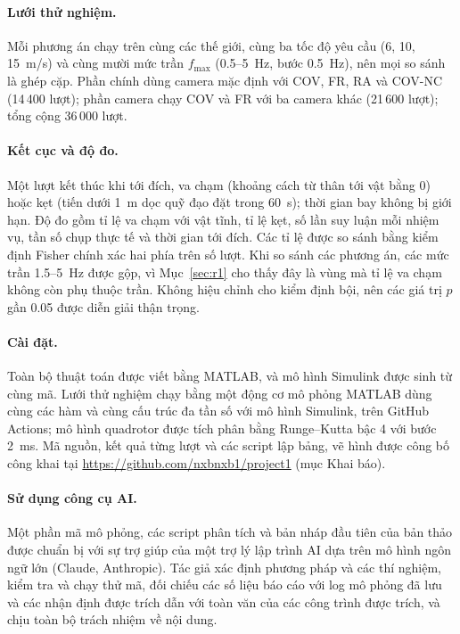\documentclass[11pt,a4paper]{article}
\theoremstyle{plain}
\theoremstyle{definition}
\theoremstyle{remark}
\newcommand{\fmax}{f_{\max}}
\begin{document}
\paragraph{Lưới thử nghiệm.} Mỗi phương án chạy trên cùng các thế giới, cùng ba tốc độ yêu cầu (6, 10, 15~m/s) và cùng mười mức trần $\fmax$ (0.5--5~Hz, bước 0.5~Hz), nên mọi so sánh là ghép cặp. Phần chính dùng camera mặc định với COV, FR, RA và COV-NC (14\,400 lượt); phần camera chạy COV và FR với ba camera khác (21\,600 lượt); tổng cộng 36\,000 lượt.

\paragraph{Kết cục và độ đo.} Một lượt kết thúc khi tới đích, va chạm (khoảng cách từ thân tới vật bằng 0) hoặc kẹt (tiến dưới 1~m dọc quỹ đạo đặt trong 60~s); thời gian bay không bị giới hạn. Độ đo gồm tỉ lệ va chạm với vật tĩnh, tỉ lệ kẹt, số lần suy luận mỗi nhiệm vụ, tần số chụp thực tế và thời gian tới đích. Các tỉ lệ được so sánh bằng kiểm định Fisher chính xác hai phía trên số lượt. Khi so sánh các phương án, các mức trần 1.5--5~Hz được gộp, vì Mục~\ref{sec:r1} cho thấy đây là vùng mà tỉ lệ va chạm không còn phụ thuộc trần. Không hiệu chỉnh cho kiểm định bội, nên các giá trị $p$ gần 0.05 được diễn giải thận trọng.

\paragraph{Cài đặt.} Toàn bộ thuật toán được viết bằng MATLAB, và mô hình Simulink được sinh từ cùng mã. Lưới thử nghiệm chạy bằng một động cơ mô phỏng MATLAB dùng cùng các hàm và cùng cấu trúc đa tần số với mô hình Simulink, trên GitHub Actions; mô hình quadrotor được tích phân bằng Runge--Kutta bậc 4 với bước 2~ms. Mã nguồn, kết quả từng lượt và các script lập bảng, vẽ hình được công bố công khai tại \url{https://github.com/nxbnxb1/project1} (mục Khai báo).

\paragraph{Sử dụng công cụ AI.} Một phần mã mô phỏng, các script phân tích và bản nháp đầu tiên của bản thảo được chuẩn bị với sự trợ giúp của một trợ lý lập trình AI dựa trên mô hình ngôn ngữ lớn (Claude, Anthropic). Tác giả xác định phương pháp và các thí nghiệm, kiểm tra và chạy thử mã, đối chiếu các số liệu báo cáo với log mô phỏng đã lưu và các nhận định được trích dẫn với toàn văn của các công trình được trích, và chịu toàn bộ trách nhiệm về nội dung.
\end{document}
